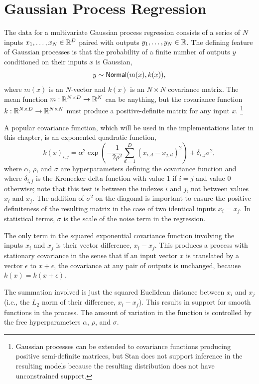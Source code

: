 \section{Gaussian Process Regression}

The data for a multivariate Gaussian process regression consists of a
series of $N$ inputs $x_1,\ldots,x_N \in \reals^D$ paired with outputs
$y_1,\ldots,y_N \in \reals$.  The defining feature of Gaussian
processes is that the probability of a finite number of outputs $y$
conditioned on their inputs $x$ is Gaussian,
\[
y \sim \distro{Normal}(m(x), k(x)),
\] 
where $m(x)$ is an $N$-vector and $k(x)$ is an $N \times N$
covariance matrix.  The mean function $m : \reals^{N \times D}
\rightarrow \reals^{N}$ can be anything, but the covariance function
$k : \reals^{N \times D} \rightarrow \reals^{N \times N}$ must produce
a positive-definite matrix for any input $x$.%
%
\footnote{Gaussian processes can be extended to covariance functions
  producing positive semi-definite matrices, but Stan does not support
  inference in the resulting models because the resulting distribution
  does not have unconstrained support.}

A popular covariance function, which will be used in the implementations later
in this chapter, is an exponented quadratic function,
\[
k(x)_{i, j}
= \alpha^2 
\exp \left(
- \dfrac{1}{2 \rho^2} \sum_{d=1}^D (x_{i,d} - x_{j,d})^2
\right)
+ \delta_{i, j} \sigma^2,
\]
where $\alpha$, $\rho$, and $\sigma$ are hyperparameters defining the
covariance function and where $\delta_{i, j}$ is the Kronecker delta
function with value 1 if $i = j$ and value 0 otherwise; note that this
test is between the indexes $i$ and $j$, not between values $x_i$ and
$x_j$. The addition of $\sigma^2$ on the diagonal is important
to ensure the positive definiteness of the resulting matrix in the case of
two identical inputs $x_i = x_j$.  In statistical terms, $\sigma$ is
the scale of the noise term in the regression.

The only term in the squared exponential covariance function involving
the inputs $x_i$ and $x_j$ is their vector difference, $x_i - x_j$.
This produces a process with stationary covariance in the sense that
if an input vector $x$ is translated by a vector $\epsilon$ to $x +
\epsilon$, the covariance at any pair of outputs is unchanged, because
$k(x) = k(x+\epsilon)$.

The summation involved is just the squared Euclidean distance between
$x_i$ and $x_j$ (i.e., the $L_2$ norm of their difference, $x_i -
x_j$). This results in support for smooth functions in the process.
The amount of variation in the function is controlled by the free
hyperparameters $\alpha$, $\rho$, and $\sigma$.  

